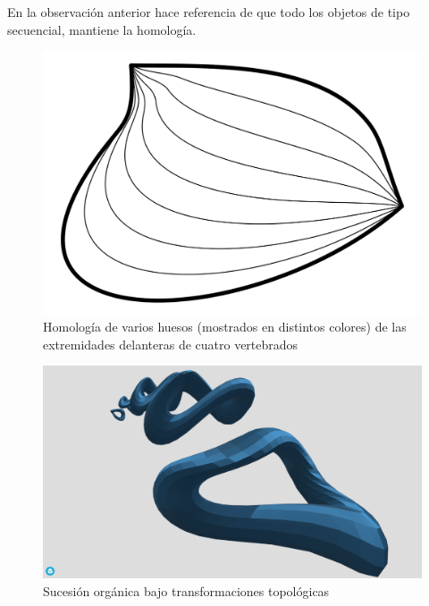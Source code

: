 \documentclass[
  11pt,
]{krantz}
\theoremstyle{definition}
\theoremstyle{definition}
\theoremstyle{definition}
\theoremstyle{definition}
\theoremstyle{remark}
\begin{document}
En la observación anterior hace referencia de que todo los objetos de tipo secuencial, mantiene la homología.

\begin{figure}[!ht]

{\centering \includegraphics[width=1\linewidth]{homotopia} 

}

\caption{Homología de varios huesos (mostrados en distintos colores) de las extremidades delanteras de cuatro vertebrados}\label{fig:homologia}
\end{figure}

\begin{figure}[!ht]

{\centering \includegraphics[width=1\linewidth]{sucecion} 

}

\caption{Sucesión orgánica bajo transformaciones topológicas}\label{fig:Suscecion}
\end{figure}
\end{document}
